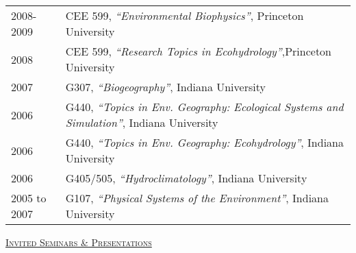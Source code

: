 \documentclass[10pt]{report}
\begin{document}
\begin{longtable}{l p{5.5in}}
2008-2009 & CEE 599, \emph{``Environmental Biophysics''}, Princeton University \\ 
2008 & CEE 599, \emph{``Research Topics in Ecohydrology''},Princeton University \\
2007 & G307, \emph{``Biogeography''}, Indiana University\\
2006 & G440, \emph{``Topics in Env. Geography: Ecological Systems and Simulation''}, Indiana University \\
2006 & G440, \emph{``Topics in Env. Geography: Ecohydrology''}, Indiana University \\
2006 & G405/505, \emph{``Hydroclimatology''}, Indiana University \\
2005 to 2007 & G107, \emph{``Physical Systems of the Environment''}, Indiana University  \\ 
\end{longtable}

\vspace{0.1in}


\textsc{\underline{Invited Seminars \& Presentations}}
\end{document}
